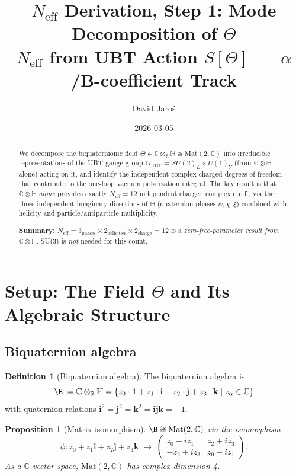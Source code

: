\documentclass[12pt,a4paper]{article}
\title{%
  $N_\mathrm{eff}$ Derivation, Step 1: Mode Decomposition of $\Theta$\\
  \large $N_{\mathrm{eff}}$ from UBT Action $S[\Theta]$ --- $\alpha$/B-coefficient Track}
\author{David Jaroš}
\date{2026-03-05}
\newtheorem{proposition}[theorem]{Proposition}
\theoremstyle{definition}
\newtheorem{definition}[theorem]{Definition}
\theoremstyle{remark}
\newcommand{\C}{\mathbb{C}}
\newcommand{\R}{\mathbb{R}}
\renewcommand{\H}{\mathbb{H}}
\newcommand{\Neff}{N_{\mathrm{eff}}}
\begin{document}
\maketitle

\begin{abstract}
We decompose the biquaternionic field $\Theta \in \C \otimes_{\R} \H \cong \mathrm{Mat}(2,\C)$
into irreducible representations of the UBT gauge group
$G_{\mathrm{UBT}} = SU(2)_L \times U(1)_Y$ (from $\C \otimes \H$ alone)
acting on it, and identify the independent complex charged degrees of freedom
that contribute to the one-loop vacuum polarization integral.
The key result is that $\C \otimes \H$ \emph{alone} provides exactly
$\Neff = 12$ independent charged complex d.o.f., via the three independent
imaginary directions of $\H$ (quaternion phases $\psi, \chi, \xi$)
combined with helicity and particle/antiparticle multiplicity.

\textbf{Summary:} $\Neff = 3_{\text{phases}} \times 2_{\text{helicities}} \times 2_{\text{charge}} = 12$
is a \emph{zero-free-parameter result from $\C \otimes \H$}.
SU(3) is \emph{not} needed for this count.
\end{abstract}

\tableofcontents

\section{Setup: The Field $\Theta$ and Its Algebraic Structure}
\label{sec:setup}

\subsection{Biquaternion algebra}

\begin{definition}[Biquaternion algebra]
The biquaternion algebra is
\begin{equation}
  \B := \C \otimes_{\R} \H
  = \{z_0 \cdot \mathbf{1} + z_1 \cdot \mathbf{i} + z_2 \cdot \mathbf{j} + z_3 \cdot \mathbf{k}
    \mid z_\alpha \in \C\}
  \label{eq:biquat_def}
\end{equation}
with quaternion relations $\mathbf{i}^2 = \mathbf{j}^2 = \mathbf{k}^2 = \mathbf{ijk} = -1$.
\end{definition}

\begin{proposition}[Matrix isomorphism]
$\B \cong \mathrm{Mat}(2,\C)$ via the isomorphism
\begin{equation}
  \phi: z_0 + z_1\mathbf{i} + z_2\mathbf{j} + z_3\mathbf{k}
  \;\longmapsto\;
  \begin{pmatrix} z_0 + iz_1 & z_2 + iz_3 \\ -z_2 + iz_3 & z_0 - iz_1 \end{pmatrix}.
  \label{eq:mat2C}
\end{equation}
As a $\C$-vector space, $\mathrm{Mat}(2,\C)$ has complex dimension 4.
\end{proposition}
\end{document}
